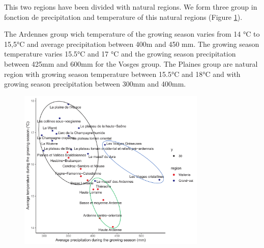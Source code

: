 \documentclass[3p,procedia]{elsarticle}
\begin{document}
This two  regions have been divided with natural regions. We form three group in fonction de precipitation and temperature of this natural regions (Figure \ref{fig:clim}).

The Ardennes group wich temperature of the growing season varies from 14 °C to 15,5°C and average precipitation between 400m and 450 mm. 
The growing season  temperature varies 15.5°C and 17 °C and the growing season  precipitation between 425mm and 600mm for the Vosges group.
The Plaines group are natural region with  growing season  temperature between 15.5°C and 18°C and with growing season  precipitation between 300mm and 400mm.

 
 

\begin{figure}
	\centering
	\includegraphics[width= 0.8\textwidth]{clim_region_nat_GE_Wal_en.png}
	\caption{	}
	
	\label{fig:clim}
\end{figure}

\end{document}
